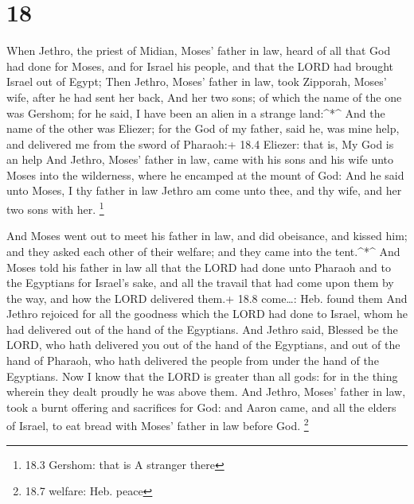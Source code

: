\hypertarget{section-17}{%
\section{18}\label{section-17}}

 When Jethro, the priest of Midian, Moses' father in law,
heard of all that God had done for Moses, and for Israel his people, and
that the LORD had brought Israel out of Egypt;  Then Jethro,
Moses' father in law, took Zipporah, Moses' wife, after he had sent her
back,  And her two sons; of which the name of the one was
Gershom; for he said, I have been an alien in a strange land:\^{}*\^{}
 And the name of the other was Eliezer; for the God of my
father, said he, was mine help, and delivered me from the sword of
Pharaoh:+ 18.4 Eliezer: that is, My God is an help  And
Jethro, Moses' father in law, came with his sons and his wife unto Moses
into the wilderness, where he encamped at the mount of God: 
And he said unto Moses, I thy father in law Jethro am come unto thee,
and thy wife, and her two sons with her. \footnote{18.3 Gershom: that is
  A stranger there}

 And Moses went out to meet his father in law, and did
obeisance, and kissed him; and they asked each other of their welfare;
and they came into the tent.\^{}*\^{}  And Moses told his
father in law all that the LORD had done unto Pharaoh and to the
Egyptians for Israel's sake, and all the travail that had come upon them
by the way, and how the LORD delivered them.+ 18.8 come\ldots: Heb.
found them  And Jethro rejoiced for all the goodness which
the LORD had done to Israel, whom he had delivered out of the hand of
the Egyptians.  And Jethro said, Blessed be the LORD, who
hath delivered you out of the hand of the Egyptians, and out of the hand
of Pharaoh, who hath delivered the people from under the hand of the
Egyptians.  Now I know that the LORD is greater than all
gods: for in the thing wherein they dealt proudly he was above them.
 And Jethro, Moses' father in law, took a burnt offering
and sacrifices for God: and Aaron came, and all the elders of Israel, to
eat bread with Moses' father in law before God. \footnote{18.7 welfare:
  Heb. peace}

